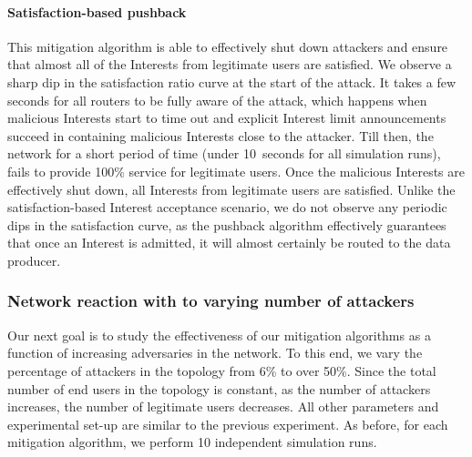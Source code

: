 \paragraph{\textbf{Satisfaction-based pushback}}

This mitigation algorithm is able to effectively shut down attackers and ensure that almost all of the Interests from legitimate users are satisfied. 
We observe a  sharp dip in the satisfaction ratio curve at the start of the attack.  It takes a few seconds for all routers to be fully aware of the attack, which happens when malicious Interests start to time out and explicit Interest limit announcements succeed in containing malicious Interests close to the attacker. Till then, the network for a short period of time (under 10~seconds for all simulation runs), fails to provide 100\% service for legitimate users. Once the malicious Interests are effectively shut down, all Interests from legitimate users are satisfied. Unlike the satisfaction-based Interest acceptance scenario, we do not observe any periodic dips in the satisfaction curve, as the pushback algorithm effectively guarantees that once an Interest is admitted, it will almost certainly be routed to the data producer.

\subsubsection{Network reaction with to varying number of attackers}

Our next goal is to study the effectiveness of our mitigation algorithms as a function of increasing adversaries in the network.
To this end, we vary the percentage of attackers in the topology from 6\% to over 50\%. Since the total number of end users in the topology is constant, as the number of attackers increases, the number of legitimate users decreases. All other parameters and experimental set-up are similar to the previous experiment. As before, for each mitigation algorithm, we perform 10 independent simulation runs.

